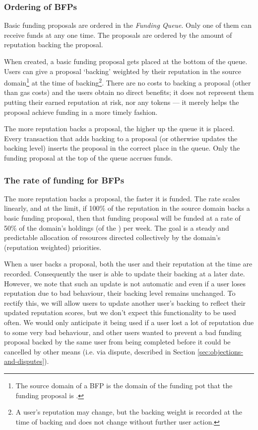 \subsubsection{Ordering of BFPs}
Basic funding proposals are ordered in the \emph{Funding Queue}. Only one of them can receive funds at any one time. The proposals are ordered by the amount of reputation backing the proposal.

When created, a basic funding proposal gets placed at the bottom of the queue. Users can give a proposal `backing' weighted by their reputation in the source domain\footnote{The source domain of a BFP is the domain of the funding pot that the funding proposal is .} at the time of backing\footnote{A user's reputation may change, but the backing weight is recorded at the time of backing and does not change without further user action.}. There are no costs to backing a proposal (other than gas costs) and the users obtain no direct benefits; it does not represent them putting their earned reputation at risk, nor any tokens --- it merely helps the proposal achieve funding in a more timely fashion.

The more reputation backs a proposal, the higher up the queue it is placed. Every transaction that adds backing to a proposal (or otherwise updates the backing level) inserts the proposal in the correct place in the queue. Only the funding proposal at the top of the queue accrues funds.

\subsubsection{The rate of funding for BFPs}
The more reputation backs a proposal, the faster it is funded. The rate scales linearly, and at the limit, if 100\% of the reputation in the source domain backs a basic funding proposal, then that funding proposal will be funded at a rate of 50\% of the domain's holdings (of the ) per week. The goal is a steady and predictable allocation of resources directed collectively by the domain's (reputation weighted) priorities.

When a user backs a proposal, both the user and their reputation at the time are recorded. Consequently the user is able to update their backing at a later date. However, we note that such an update is not automatic and even if a user loses reputation due to bad behaviour, their backing level remains unchanged. To rectify this, we will allow users to update another user's backing to reflect their updated reputation scores, but we don't expect this functionality to be used often. We would only anticipate it being used if a user lost a lot of reputation due to some very bad behaviour, and other users wanted to prevent a bad funding proposal backed by the same user from being completed before it could be cancelled by other means (i.e. via dispute, described in Section \ref{sec:objections-and-disputes}).

